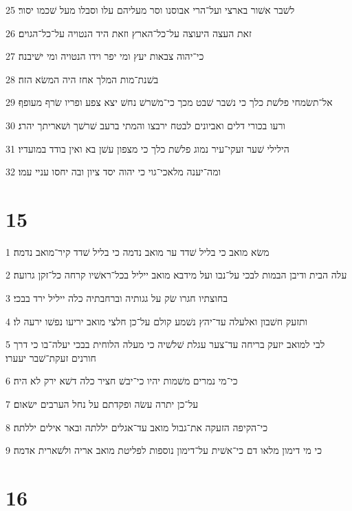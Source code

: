 \par 25 לשׁבר אשׁור בארצי ועל־הרי אבוסנו וסר מעליהם עלו וסבלו מעל שׁכמו יסור׃
\par 26 זאת העצה היעוצה על־כל־הארץ וזאת היד הנטויה על־כל־הגוים׃
\par 27 כי־יהוה צבאות יעץ ומי יפר וידו הנטויה ומי ישׁיבנה׃
\par 28 בשׁנת־מות המלך אחז היה המשׂא הזה׃
\par 29 אל־תשׂמחי פלשׁת כלך כי נשׁבר שׁבט מכך כי־משׁרשׁ נחשׁ יצא צפע ופריו שׂרף מעופף׃
\par 30 ורעו בכורי דלים ואביונים לבטח ירבצו והמתי ברעב שׁרשׁך ושׁאריתך יהרג׃
\par 31 הילילי שׁער זעקי־עיר נמוג פלשׁת כלך כי מצפון עשׁן בא ואין בודד במועדיו׃
\par 32 ומה־יענה מלאכי־גוי כי יהוה יסד ציון ובה יחסו עניי עמו׃

\chapter{15}

\par 1 משׂא מואב כי בליל שׁדד ער מואב נדמה כי בליל שׁדד קיר־מואב נדמה׃
\par 2 עלה הבית ודיבן הבמות לבכי על־נבו ועל מידבא מואב ייליל בכל־ראשׁיו קרחה כל־זקן גרועה׃
\par 3 בחוצתיו חגרו שׂק על גגותיה וברחבתיה כלה ייליל ירד בבכי׃
\par 4 ותזעק חשׁבון ואלעלה עד־יהץ נשׁמע קולם על־כן חלצי מואב יריעו נפשׁו ירעה לו׃
\par 5 לבי למואב יזעק בריחה עד־צער עגלת שׁלשׁיה כי מעלה הלוחית בבכי יעלה־בו כי דרך חורנים זעקת־שׁבר יעערו׃
\par 6 כי־מי נמרים משׁמות יהיו כי־יבשׁ חציר כלה דשׁא ירק לא היה׃
\par 7 על־כן יתרה עשׂה ופקדתם על נחל הערבים ישׂאום׃
\par 8 כי־הקיפה הזעקה את־גבול מואב עד־אגלים יללתה ובאר אילים יללתה׃
\par 9 כי מי דימון מלאו דם כי־אשׁית על־דימון נוספות לפליטת מואב אריה ולשׁארית אדמה׃

\chapter{16}

